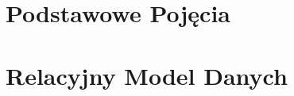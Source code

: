 \documentclass[12pt, a4paper, polish, openany]{book}
\author{
}
\begin{document}
\frontmatter



\tableofcontents


\mainmatter

\chapter{Podstawowe Pojęcia}


\chapter{Relacyjny Model Danych}

\end{document}
